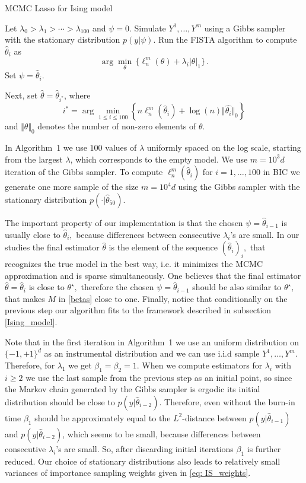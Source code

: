 \documentclass[twoside,11pt]{article}
\def\llnm{\ell_n^m}
\def\th{\theta}
\def\ths{\th^\star}
\def\hth{\hat{\theta}}
\begin{document}
\begin{algorithm}[H]\caption{MCMC Lasso for Ising model}
\begin{algorithmic}
 \STATE Let $\lambda_0>\lambda_1>\cdots>\lambda_{100}$ and $\psi=0$.
 \STATE Simulate $Y^1,\dots,Y^m$ using a Gibbs sampler with the stationary distribution $p(y|\psi)$.
 \STATE Run the FISTA algorithm to compute $\hat\theta_i$ as 
 \[\arg \min\limits_{\th} \,\{ \ell_n^m(\theta)+\lambda_i|\theta|_1\}\,.\]
 \STATE Set $\psi=\hat\theta_i.$
  \ENDFOR
 \end{algorithmic}
 Next, set $\hth = \hth _{i^*}$, where
\[
 i^*=\arg \min_{1 \leq i \leq 100} \left \{n\llnm (\hat{\th} _i)+\log(n)\Vert \hat{ \theta_i} \Vert_0\right\}
\]
and $\Vert\theta\Vert_0$ denotes the  number of non-zero elements of  $\theta$.
\end{algorithm}

In Algorithm~1 we use $100$ values of $\lambda$ uniformly spaced on the log scale, starting from the largest $\lambda$, which corresponds to the empty model.
We use $m=10^3 d$ iteration of the Gibbs sampler. To compute $\llnm (\hat{\th} _i)$ for $i=1,\ldots,100$ in BIC we generate one more sample of the size $m=10^4 d$ using the Gibbs sampler with the stationary distribution  $p(\cdot|\hat \theta_{50}).$


The important property of our implementation is that the chosen $\psi = \hth _{i-1}$ is usually close to $\hth _i,$ because differences between consecutive $\lambda_i$'s are small. 
In our studies the final estimator $\hth$ is the element of the sequence $(\hth _i)_i,$ that 
recognizes the true model in the best way, i.e. it minimizes the MCMC approximation and is sparse simultaneously. One believes that the final estimator $\hth=\hth _i$ is close to $\ths,$ therefore the chosen $\psi= \hth _{i-1}$ should  be also 
similar to $\ths ,$ that makes $M$ in \eqref{betas} close to one. 
Finally, notice that conditionally on the previous step our algorithm fits to the framework described in subsection \ref{Ising_model}.


Note that in the first iteration in Algorithm~1 we use an uniform distribution on $\{-1,+1\}^d$ as an instrumental distribution and we can use i.i.d sample $Y^1,\dots,Y^m$. Therefore, for 
$\lambda_1$
we get $\beta_1=\beta_2=1$. When we compute estimators for $\lambda_i$ with $i\geq 2$  we use the last sample from the previous step as an initial point, so since the Markov chain generated by the Gibbs sampler is ergodic its initial distribution should be close to 
$p(y|\hat \theta_{i-2})$. Therefore, even without the burn-in time  $\beta_1$ should be approximately equal to the $L^2$-distance between $p(y|\hat \theta_{i-1})$ and $p(y|\hat \theta_{i-2})$, which seems to be small, because differences between
consecutive $\lambda_i$'s are small. So, after discarding initial iterations  $\beta_1$ is further reduced. Our choice of stationary distributions also leads to relatively small variances of importance sampling weights given in  \eqref{eq: IS_weights}. 
\end{document}

